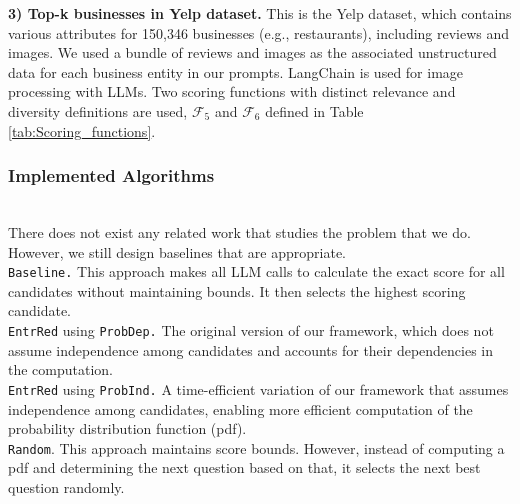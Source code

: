 \noindent \textbf{3) Top-k businesses in Yelp dataset.} This is the Yelp dataset, which contains various attributes for 150,346 businesses (e.g., restaurants), including reviews and images. We used a bundle of reviews and images as the associated unstructured data for each business entity in our prompts. LangChain is used for image processing with LLMs. Two scoring functions with distinct relevance and diversity definitions are used, \(\mathcal{F}_5\) and \(\mathcal{F}_6\) defined in Table \ref{tab:Scoring_functions}.

\begin{comment}
   \begin{itemize}
  \item \(\mathcal{F}_5\): 
    \begin{itemize}
      \item Relevance definition: "Location near New York"
      \item Diversity definition: "Cost variety"
    \end{itemize}
  \item \(\mathcal{F}_6\):
    \begin{itemize}
      \item Relevance definition: "Cuisine type"
      \item Diversity definition: "Varied operating hours"
    \end{itemize}
\end{itemize} 
\end{comment}


\subsubsection{Implemented Algorithms}\label{sec:exp_algs}
\ \\
There does not exist any related work that studies the problem that we do. However, we still design baselines that are appropriate.\\
\noindent {\bf ***} \texttt{Baseline.} This approach makes all LLM calls to calculate the exact score for all candidates without maintaining bounds. It then selects the highest scoring candidate.\\
\noindent {\bf ***} \texttt{EntrRed} using {\tt ProbDep.} The original version of our  framework, which does not assume independence among candidates and accounts for their dependencies in the computation.\\
\noindent {\bf ***} {\tt EntrRed} using {\tt ProbInd.} A time-efficient variation of our  framework that assumes independence among candidates, enabling more efficient computation of the probability distribution function (pdf).\\
\noindent {\bf ***} {\tt Random}. This approach maintains score bounds. However, instead of computing a pdf and determining the next question based on that, it selects the next best question randomly.


